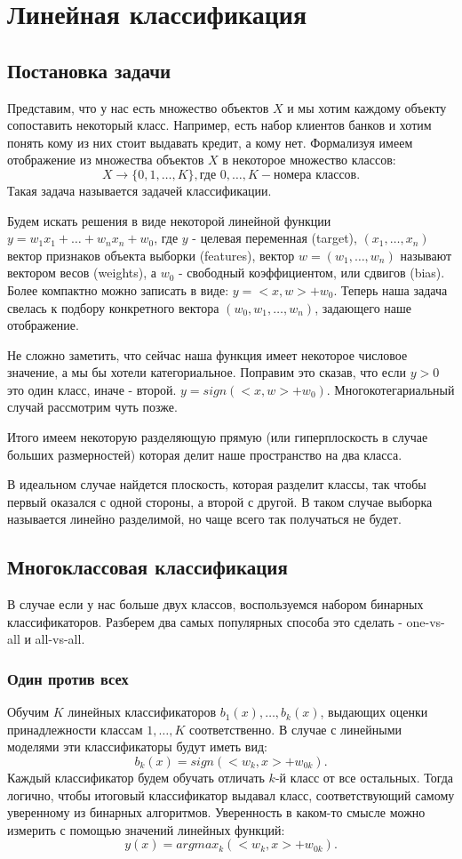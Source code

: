 \section{Линейная классификация}
\subsection{Постановка задачи}
Представим, что у нас есть множество объектов $X$ и мы хотим каждому объекту сопоставить некоторый класс. Например, есть набор клиентов банков и хотим понять кому из них стоит выдавать кредит, а кому нет. Формализуя имеем отображение из множества объектов $X$ в некоторое множество классов: $$X \rightarrow \{0, 1, \ldots, K\}, \text{где } 0, \ldots, K - \text{номера классов}.$$
Такая задача называется задачей классификации.

Будем искать решения в виде некоторой линейной функции $y = w_1x_1 + \ldots + w_nx_n + w_0$, где $y$ - целевая переменная (target), $(x_1, \ldots, x_n)$ вектор признаков объекта выборки (features), вектор $w = (w_1, \ldots, w_n)$ называют вектором весов (weights), а $w_0$ - свободный коэффициентом, или сдвигов (bias). Более компактно можно записать в виде: $y = <x, w> + w_0$. Теперь наша задача свелась к подбору конкретного вектора $(w_0, w_1, \ldots, w_n)$, задающего наше отображение. 

Не сложно заметить, что сейчас наша функция имеет некоторое числовое значение, а мы бы хотели категориальное. Поправим это сказав, что если $y > 0$ это один класс, иначе - второй. $y = sign (<x, w> + w_0)$. Многокотегариальный случай рассмотрим чуть позже.

Итого имеем некоторую разделяющую прямую (или гиперплоскость в случае больших размерностей) которая делит наше пространство на два класса.

В идеальном случае найдется плоскость, которая разделит классы, так чтобы первый оказался с одной стороны, а второй с другой. В таком случае выборка называется линейно разделимой, но чаще всего так получаться не будет.

\subsection{Многоклассовая классификация}
В случае если у нас больше двух классов, воспользуемся набором бинарных классификаторов. Разберем два самых популярных способа это сделать - one-vs-all и all-vs-all.
\subsubsection*{Один против всех}
Обучим $K$ линейных классификаторов $b_1(x), \ldots, b_k(x)$, выдающих оценки принадлежности классам $1, \ldots, K$ соответственно. В случае с линейными моделями эти классификаторы будут иметь вид:
$$b_k(x) = sign(<w_k, x> + w_{0k}).$$
Каждый классификатор будем обучать отличать $k$-й класс от все остальных. Тогда логично, чтобы итоговый классификатор выдавал класс, соответствующий самому уверенному из бинарных алгоритмов. Уверенность в каком-то смысле можно измерить с помощью значений линейных функций:
$$y(x) = argmax_k(<w_k, x> + w_{0k}).$$
